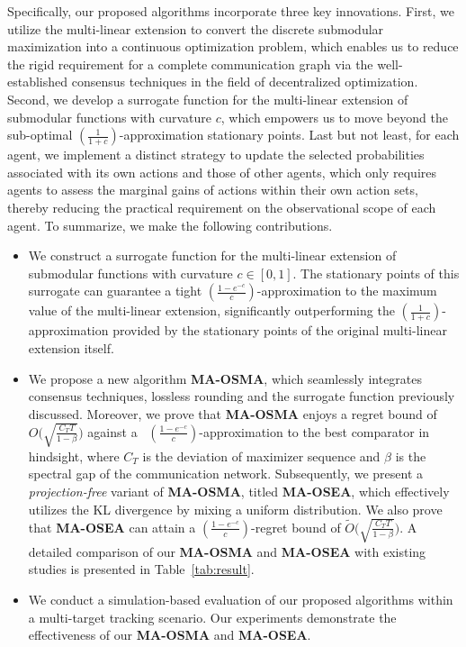   Specifically, our proposed algorithms incorporate three key innovations. First, we utilize the multi-linear extension to convert the discrete submodular maximization into a continuous optimization problem, which enables us to reduce the rigid requirement for a complete communication graph via the well-established consensus techniques in the field of decentralized optimization. Second, we develop a surrogate function for the multi-linear extension of submodular functions with curvature $c$, which empowers us to move beyond the sub-optimal $(\frac{1}{1+c})$-approximation stationary points. Last but not least, for each agent, we implement a distinct strategy to update the selected probabilities associated with its own actions and those of other agents, which only requires agents to assess the marginal gains of actions within their own action sets, thereby reducing the practical requirement on the observational scope of each agent. To summarize, we make the following contributions.
  \vspace{-0.2em}
	\begin{itemize}[leftmargin=*]
	\item We construct a surrogate function for the multi-linear extension of submodular functions with curvature $c\in[0,1]$. The stationary points of this surrogate can guarantee a tight $(\frac{1-e^{-c}}{c})$-approximation to the maximum value of the multi-linear extension, significantly outperforming the $(\frac{1}{1+c})$-approximation provided by the stationary points of the original multi-linear extension itself.
\item We propose a new algorithm \textbf{MA-OSMA}, which seamlessly integrates consensus techniques, lossless rounding and the surrogate function previously discussed. Moreover, we prove that \textbf{MA-OSMA} enjoys a regret bound of $O\Big(\sqrt{\frac{C_{T}T}{1-\beta}}\Big)$ against a  $(\frac{1-e^{-c}}{c})$-approximation to the best comparator in hindsight, where $C_{T}$ is the deviation of maximizer sequence and $\beta$ is the spectral gap of the communication network. Subsequently, we present a \emph{projection-free} variant of \textbf{MA-OSMA}, titled \textbf{MA-OSEA}, which effectively utilizes the KL divergence by mixing a uniform distribution. We also prove that \textbf{MA-OSEA} can attain a $(\frac{1-e^{-c}}{c})$-regret bound of $\widetilde{O}\Big(\sqrt{\frac{C_{T}T}{1-\beta}}\Big)$. A detailed comparison of our \textbf{MA-OSMA} and \textbf{MA-OSEA} with existing studies is presented in Table~\ref{tab:result}.
	\item 
 We conduct a simulation-based evaluation of our proposed algorithms within a multi-target tracking scenario.
 Our experiments demonstrate the effectiveness of our \textbf{MA-OSMA} and \textbf{MA-OSEA}.
	\end{itemize}
